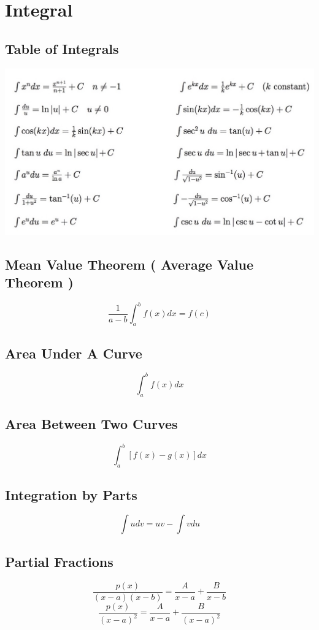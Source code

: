 \documentclass[12pt]{article}
\begin{document}
\section{Integral}

\subsection{Table of Integrals}
\includegraphics[width=\linewidth]{IntegralTable}


\subsection{Mean Value Theorem ( Average Value Theorem ) }
\[
	\frac{1}{a-b} \int_a^b f(x) dx = f(c)
\]

\subsection{Area Under A Curve}
\[
	\int_a^b f(x) dx
\]

\subsection{Area Between Two Curves}


\[
	\int_a^b \left [ f(x) - g(x) \right ] dx
\]


\subsection{Integration by Parts}
\[
	\int u dv = u v - \int v du
\]

\subsection{Partial Fractions}
\[
	\frac{p(x)}{(x - a)(x-b)} = \frac{A}{x-a} + \frac{B}{x-b}
\]
\[
	\frac{p(x)}{(x - a)^{2}} = \frac{A}{x-a} + \frac{B}{(x-a)^{2}}
\]
\end{document}
